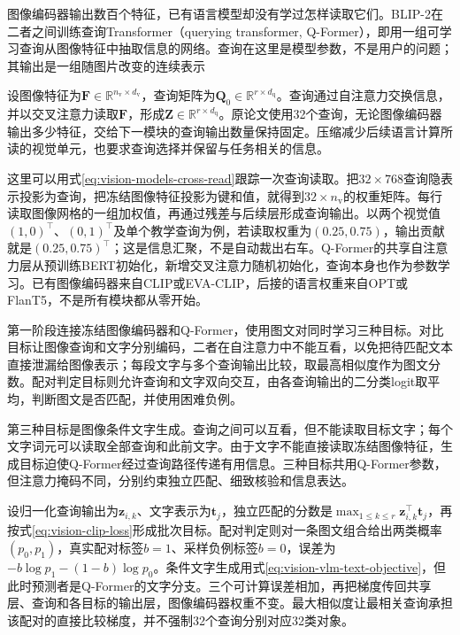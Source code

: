 图像编码器输出数百个特征，已有语言模型却没有学过怎样读取它们。BLIP-2在二者之间训练查询Transformer（querying transformer, Q-Former），即用一组可学习查询从图像特征中抽取信息的网络。查询在这里是模型参数，不是用户的问题；其输出是一组随图片改变的连续表示

设图像特征为$\bm F\in\mathbb R^{n_{\mathrm v}\times d_{\mathrm v}}$，查询矩阵为$\bm Q_0\in\mathbb R^{r\times d_{\mathrm q}}$。查询通过自注意力交换信息，并以交叉注意力读取$\bm F$，形成$\bm Z\in\mathbb R^{r\times d_{\mathrm q}}$。原论文使用32个查询，无论图像编码器输出多少特征，交给下一模块的查询输出数量保持固定。压缩减少后续语言计算所读的视觉单元，也要求查询选择并保留与任务相关的信息。

这里可以用式\eqref{eq:vision-models-cross-read}跟踪一次查询读取。把$32\times768$查询隐表示投影为查询，把冻结图像特征投影为键和值，就得到$32\times n_{\mathrm v}$的权重矩阵。每行读取图像网格的一组加权值，再通过残差与后续层形成查询输出。以两个视觉值$(1,0)^\top$、$(0,1)^\top$及单个教学查询为例，若读取权重为$(0.25,0.75)$，输出贡献就是$(0.25,0.75)^\top$；这是信息汇聚，不是自动裁出右车。Q-Former的共享自注意力层从预训练BERT初始化，新增交叉注意力随机初始化，查询本身也作为参数学习。已有图像编码器来自CLIP或EVA-CLIP，后接的语言权重来自OPT或FlanT5，不是所有模块都从零开始。

第一阶段连接冻结图像编码器和Q-Former，使用图文对同时学习三种目标。对比目标让图像查询和文字分别编码，二者在自注意力中不能互看，以免把待匹配文本直接泄漏给图像表示；每段文字与多个查询输出比较，取最高相似度作为图文分数。配对判定目标则允许查询和文字双向交互，由各查询输出的二分类logit取平均，判断图文是否匹配，并使用困难负例。

第三种目标是图像条件文字生成。查询之间可以互看，但不能读取目标文字；每个文字词元可以读取全部查询和此前文字。由于文字不能直接读取冻结图像特征，生成目标迫使Q-Former经过查询路径传递有用信息。三种目标共用Q-Former参数，但注意力掩码不同，分别约束独立匹配、细致核验和信息表达。

设归一化查询输出为$\bm z_{i,k}$、文字表示为$\bm t_j$，独立匹配的分数是$\max_{1\leq k\leq r}\bm z_{i,k}^{\top}\bm t_j$，再按式\eqref{eq:vision-clip-loss}形成批次目标。配对判定则对一条图文组合给出两类概率$(p_0,p_1)$，真实配对标签$b=1$、采样负例标签$b=0$，误差为$-b\log p_1-(1-b)\log p_0$。条件文字生成用式\eqref{eq:vision-vlm-text-objective}，但此时预测者是Q-Former的文字分支。三个可计算误差相加，再把梯度传回共享层、查询和各目标的输出层，图像编码器权重不变。最大相似度让最相关查询承担该配对的直接比较梯度，并不强制32个查询分别对应32类对象。


